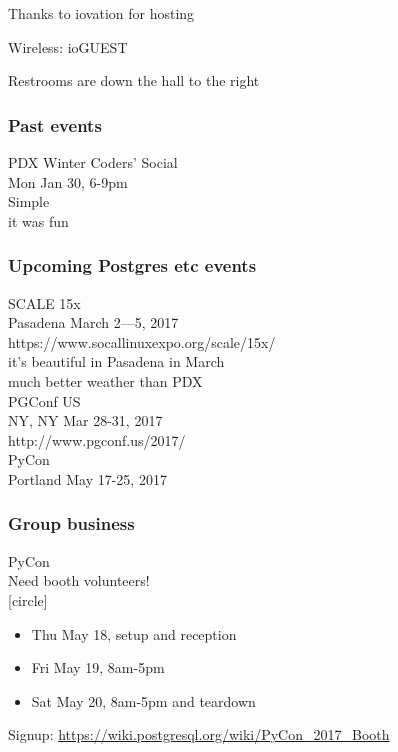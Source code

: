 \documentclass{beamer}
\begin{document}

\frame
{
  \begin{center}
  \item[]Thanks to iovation for hosting
  \item[]Wireless: ioGUEST
  \item[]Restrooms are down the hall to the right
  \end{center}
}

\frame
{
  \frametitle{Past events}
  \begin{center}
 {\large PDX Winter Coders' Social\\}
Mon Jan 30, 6-9pm\\
Simple\\
  
{\tiny it was fun\\}
  \vspace{5mm}
  \end{center}
}

\frame
{
  \frametitle{Upcoming Postgres etc events}
  \begin{center}
 {\large SCALE 15x\\}
Pasadena March 2—5, 2017\\
https://www.socallinuxexpo.org/scale/15x/\\
  \vspace{2mm}
  {\tiny it's beautiful in Pasadena in March\\
  much better weather than PDX\\}
  \vspace{5mm}
 {\large PGConf US\\}
NY, NY Mar 28-31, 2017\\
http://www.pgconf.us/2017/\\
  \vspace{5mm}
 {\large PyCon\\}
 Portland May 17-25, 2017
  \end{center}
}

\frame
{
  \frametitle{Group business}
  \begin{center}
{\large PyCon\\}
Need booth volunteers!\\
[circle]
\begin{itemize}
\item Thu May 18, setup and reception\\
\item Fri May 19, 8am-5pm\\
\item Sat May 20, 8am-5pm and teardown\\
\end{itemize}
\vspace{5mm}
Signup: \url{https://wiki.postgresql.org/wiki/PyCon_2017_Booth}
\vspace{5mm}
  \end{center}
}
\end{document}
